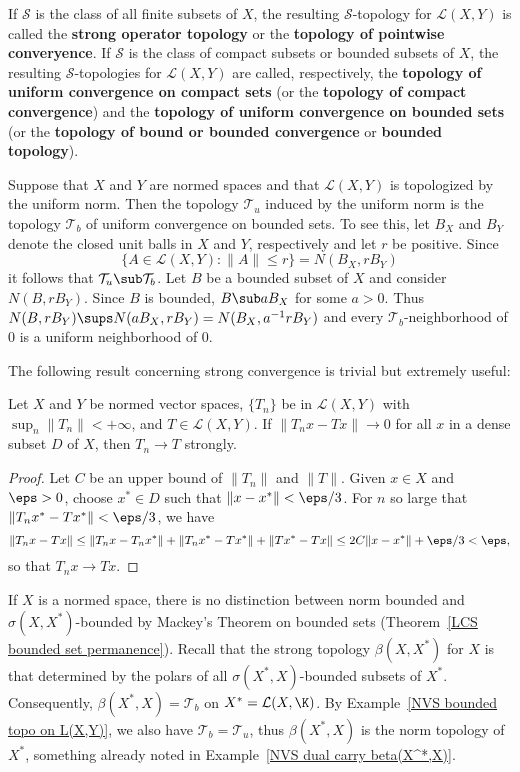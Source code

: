 If $\mathcal{S}$ is the class of all finite subsets of $X$, the resulting $\mathcal{S}$-topology for $\mathcal{L}(X,Y)$ is called the \textbf{strong operator topology} or the \textbf{topology of pointwise converyence}. If $\mathcal{S}$ is the class of compact subsets or bounded subsets of $X$, the resulting $\mathcal{S}$-topologies for $\mathcal{L}(X,Y)$ are called, respectively, the \textbf{topology of uniform convergence on compact sets} (or the \textbf{topology of compact convergence}) and the \textbf{topology of uniform convergence on bounded sets} (or the \textbf{topology of bound or bounded convergence} or \textbf{bounded topology}).
\begin{example}\label{NVS bounded topo on L(X,Y)}
Suppose that $X$ and $Y$ are normed spaces and that $\mathcal{L}(X,Y)$ is topologized by the uniform norm. Then the topology $\mathcal{T}_u$ induced by the uniform norm is the topology $\mathcal{T}_b$ of uniform convergence on bounded sets. To see this, let $B_X$ and $B_Y$ denote the closed unit balls in $X$ and $Y$, respectively and let $r$ be positive. Since
\[\{A\in\mathcal{L}(X,Y):\|A\|\leq r\}=N(B_X,rB_Y)\]
it follows that $\mathcal{T}_u\sub\mathcal{T}_b$. Let $B$ be a bounded subset of $X$ and consider $N(B,rB_Y)$. Since $B$ is bounded, $B\sub aB_X$ for some $a>0$. Thus $N(B,rB_Y)\sups N(aB_X,rB_Y)=N(B_X,a^{-1}rB_Y)$ and every $\mathcal{T}_b$-neighborhood of $0$ is a uniform neighborhood of $0$.
\end{example}
The following result concerning strong convergence is trivial but extremely useful:
\begin{proposition}\label{bounded operator converge on dense}
Let $X$ and $Y$ be normed vector spaces, $\{T_n\}$ be in $\mathcal{L}(X,Y)$ with $\sup_n\|T_n\|<+\infty$, and $T\in\mathcal{L}(X,Y)$. If $\|T_nx-Tx\|\to 0$ for all $x$ in a dense subset $D$ of $X$, then $T_n\to T$ strongly.
\end{proposition}
\begin{proof}
Let $C$ be an upper bound of $\|T_n\|$ and $\|T\|$. Given $x\in X$ and $\eps>0$, choose $x^*\in D$ such that $\|x-x^*\|<\eps/3$. For $n$ so large that $\|T_nx^*-Tx^*\|<\eps/3$, we have
\[\|T_nx-Tx\|\leq\|T_nx-T_nx^*\|+\|T_nx^*-Tx^*\|+\|Tx^*-Tx\|\leq 2C\|x-x^*\|+\eps/3<\eps,\]
so that $T_nx\to Tx$.
\end{proof}
\begin{example}
If $X$ is a normed space, there is no distinction between norm bounded and $\sigma(X,X^*)$-bounded by Mackey's Theorem on bounded sets (Theorem~\ref{LCS bounded set permanence}). Recall that the strong topology $\beta(X,X^*)$ for $X$ is that determined by the polars of all $\sigma(X^*,X)$-bounded subsets of $X^*$. Consequently, $\beta(X^*,X)=\mathcal{T}_b$ on $X^*=\mathcal{L}(X,\K)$. By Example~\ref{NVS bounded topo on L(X,Y)}, we also have $\mathcal{T}_b=\mathcal{T}_u$, thus $\beta(X^*,X)$ is the norm topology of $X^*$, something already noted in Example~\ref{NVS dual carry beta(X^*,X)}.
\end{example}
